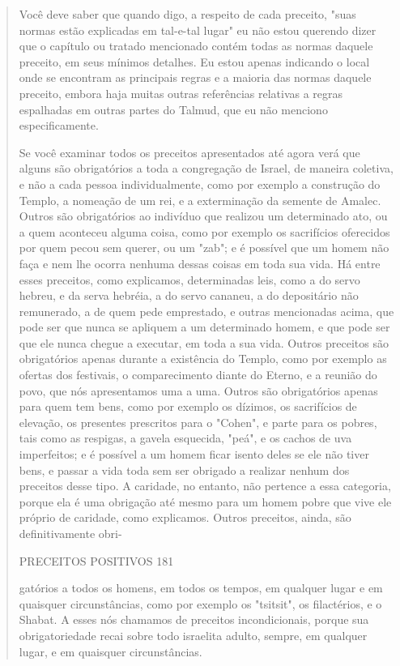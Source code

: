 \begin{quote}
Você deve saber que quando digo, a respeito de cada preceito, "suas
normas estão explicadas em tal-e-tal lugar" eu não estou querendo dizer
que o capítulo ou tratado mencionado contém todas as normas daquele
preceito, em seus mínimos detalhes. Eu estou apenas indicando o local
onde se encon­tram as principais regras e a maioria das normas daquele
preceito, embora haja muitas outras referências relativas a regras
espalhadas em outras partes do Tal­mud, que eu não menciono
especificamente.

Se você examinar todos os preceitos apresentados até agora verá que
alguns são obrigatórios a toda a congregação de Israel, de maneira
coletiva, e não a cada pessoa individualmente, como por exemplo a
construção do Tem­plo, a nomeação de um rei, e a exterminação da semente
de Amalec. Outros são obrigatórios ao indivíduo que realizou um
determinado ato, ou a quem acon­teceu alguma coisa, como por exemplo os
sacrifícios oferecidos por quem pe­cou sem querer, ou um "zab"; e é
possível que um homem não faça e nem lhe ocorra nenhuma dessas coisas em
toda sua vida. Há entre esses preceitos, como explicamos, determinadas
leis, como a do servo hebreu, e da serva he­bréia, a do servo cananeu, a
do depositário não remunerado, a de quem pede emprestado, e outras
mencionadas acima, que pode ser que nunca se apliquem a um determinado
homem, e que pode ser que ele nunca chegue a executar, em toda a sua
vida. Outros preceitos são obrigatórios apenas durante a existên­cia do
Templo, como por exemplo as ofertas dos festivais, o comparecimento
diante do Eterno, e a reunião do povo, que nós apresentamos uma a uma.
Ou­tros são obrigatórios apenas para quem tem bens, como por exemplo os
dízi­mos, os sacrifícios de elevação, os presentes prescritos para o
"Cohen", e par­te para os pobres, tais como as respigas, a gavela
esquecida, "peá", e os cachos de uva imperfeitos; e é possível a um
homem ficar isento deles se ele não tiver bens, e passar a vida toda sem
ser obrigado a realizar nenhum dos preceitos desse tipo. A caridade, no
entanto, não pertence a essa categoria, porque ela é uma obrigação até
mesmo para um homem pobre que vive ele próprio de caridade, como
explicamos. Outros preceitos, ainda, são definitivamente obri-

PRECEITOS POSITIVOS 181

gatórios a todos os homens, em todos os tempos, em qualquer lugar e em
quais­quer circunstâncias, como por exemplo os "tsitsit", os
filactérios, e o Shabat. A esses nós chamamos de preceitos
incondicionais, porque sua obrigatorieda­de recai sobre todo israelita
adulto, sempre, em qualquer lugar, e em quaisquer circunstâncias.


\end{quote}
